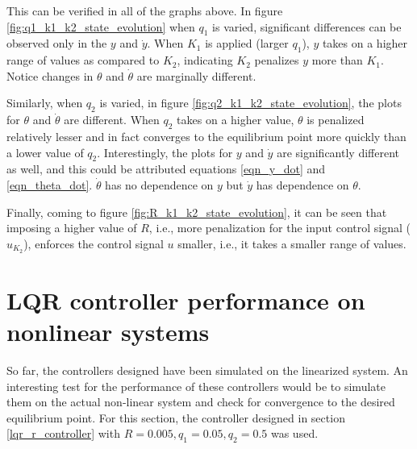 \documentclass[10pt]{article}
\begin{document}
This can be verified in all of the graphs above. In figure \ref{fig:q1_k1_k2_state_evolution} when $q_1$ is varied, significant differences can be observed only in the $y$ and $\dot{y}$. When $K_1$ is applied (larger $q_1$), $y$ takes on a higher range of values as compared to $K_2$, indicating $K_2$ penalizes $y$ more than $K_1$. Notice changes in $\theta$ and $\dot{\theta}$ are marginally different.

Similarly, when $q_2$ is varied, in figure \ref{fig:q2_k1_k2_state_evolution}, the plots for $\theta$ and $\dot{\theta}$ are different. When $q_2$ takes on a higher value, $\theta$ is penalized relatively lesser and in fact converges to the equilibrium point more quickly than a lower value of $q_2$. Interestingly, the plots for $y$ and $\dot{y}$ are significantly different as well, and this could be attributed equations \ref{eqn_y_dot} and \ref{eqn_theta_dot}. $\dot{\theta}$ has no dependence on $y$ but $\dot{y}$ has dependence on $\theta$.

Finally, coming to figure \ref{fig:R_k1_k2_state_evolution}, it can be seen that imposing a higher value of $R$, i.e., more penalization for the input control signal ($u_{K_2}$), enforces the control signal $u$ smaller, i.e., it takes a smaller range of values.

\section{LQR controller performance on nonlinear systems}

So far, the controllers designed have been simulated on the linearized system. An interesting test for the performance of these controllers would be to simulate them on the actual non-linear system and check for convergence to the desired equilibrium point. For this section, the controller designed in section \ref{lqr_r_controller} with $R = 0.005, q_1 = 0.05, q_2 = 0.5$ was used.
\end{document}
